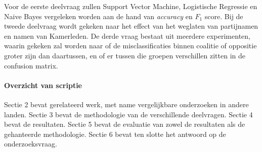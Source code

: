 Voor de eerste deelvraag zullen Support Vector Machine, Logistische Regressie en Naive Bayes vergeleken worden aan de hand van \textit{accuracy} en $F_1$ score. Bij de tweede deelvraag wordt gekeken naar het effect van het weglaten van partijnamen en namen van Kamerleden. De derde vraag bestaat uit meerdere experimenten, waarin gekeken zal worden naar of de misclassificaties binnen coalitie of oppositie groter zijn dan daartussen, en of er tussen die groepen verschillen zitten in de confusion matrix.


\paragraph{Overzicht van scriptie}
Sectie 2 bevat gerelateerd werk, met name vergelijkbare onderzoeken in andere landen. Sectie 3 bevat de methodologie van de verschillende deelvragen. Sectie 4 bevat de resultaten. Sectie 5 bevat de evaluatie van zowel de resultaten als de gehanteerde methodologie. Sectie 6 bevat ten slotte het antwoord op de onderzoeksvraag.
